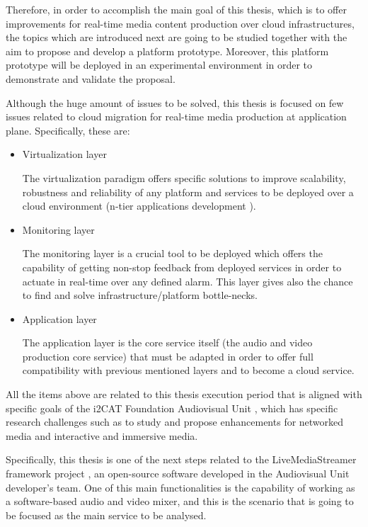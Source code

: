 Therefore, in order to accomplish the main goal of this thesis, which is to offer improvements for real-time media content production over cloud infrastructures, the topics which are introduced next are going to be studied together with the aim to propose and develop a platform prototype. Moreover, this platform prototype will be deployed in an experimental environment in order to demonstrate and validate the proposal.

Although the huge amount of issues to be solved, this thesis is focused on few issues related to cloud migration for real-time media production at application plane. Specifically, these are:

\begin{itemize}
\item Virtualization layer \hfill 

The virtualization paradigm offers specific solutions to improve scalability, robustness and reliability of any platform and services to be deployed over a cloud environment (n-tier applications development \cite{n-tier architecture}). 

\item Monitoring layer \hfill 

The monitoring layer is a crucial tool to be deployed which offers the capability of getting non-stop feedback from deployed services in order to actuate in real-time over any defined alarm. This layer gives also the chance to find and solve infrastructure/platform bottle-necks.

\item Application layer \hfill 

The application layer is the core service itself (the audio and video production core service) that must be adapted in order to offer full compatibility with previous mentioned layers and to become a cloud service.

\end{itemize}

All the items above are related to this thesis execution period that is aligned with specific goals of the i2CAT Foundation Audiovisual Unit \cite{i2catua}, which has specific research challenges such as to study and propose enhancements for networked media and interactive and immersive media. 

Specifically, this thesis is one of the next steps related to the LiveMediaStreamer framework project \cite{lmsGITHUB}, an open-source software developed in the Audiovisual Unit developer's team. One of this main functionalities is the capability of working as a software-based audio and video mixer, and this is the scenario that is going to be focused as the main service to be analysed.

